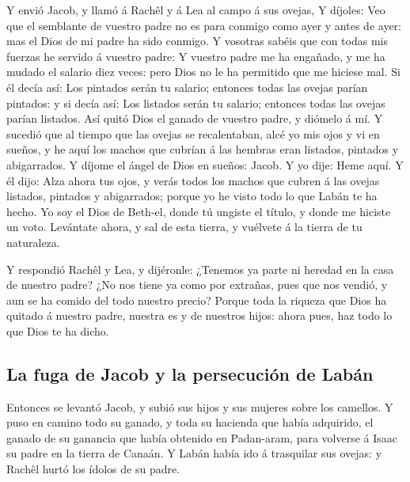 Y envió Jacob, y llamó á Rachêl y á Lea al campo á sus
ovejas,  Y díjoles: Veo que el semblante de vuestro padre no
es para conmigo como ayer y antes de ayer: mas el Dios de mi padre ha
sido conmigo.  Y vosotras sabéis que con todas mis fuerzas
he servido á vuestro padre:  Y vuestro padre me ha engañado,
y me ha mudado el salario diez veces: pero Dios no le ha permitido que
me hiciese mal.  Si él decía así: Los pintados serán tu
salario; entonces todas las ovejas parían pintados: y si decía así: Los
listados serán tu salario; entonces todas las ovejas parían listados.
 Así quitó Dios el ganado de vuestro padre, y diómelo á mí.
 Y sucedió que al tiempo que las ovejas se recalentaban,
alcé yo mis ojos y vi en sueños, y he aquí los machos que cubrían á las
hembras eran listados, pintados y abigarrados.  Y díjome el
ángel de Dios en sueños: Jacob. Y yo dije: Heme aquí.  Y él
dijo: Alza ahora tus ojos, y verás todos los machos que cubren á las
ovejas listados, pintados y abigarrados; porque yo he visto todo lo que
Labán te ha hecho.  Yo soy el Dios de Beth-el, donde tú
ungiste el título, y donde me hiciste un voto. Levántate ahora, y sal de
esta tierra, y vuélvete á la tierra de tu naturaleza.

 Y respondió Rachêl y Lea, y dijéronle: ¿Tenemos ya parte
ni heredad en la casa de nuestro padre?  ¿No nos tiene ya
como por extrañas, pues que nos vendió, y aun se ha comido del todo
nuestro precio?  Porque toda la riqueza que Dios ha quitado
á nuestro padre, nuestra es y de nuestros hijos: ahora pues, haz todo lo
que Dios te ha dicho.

\hypertarget{la-fuga-de-jacob-y-la-persecuciuxf3n-de-labuxe1n}{%
\subsection{La fuga de Jacob y la persecución de
Labán}\label{la-fuga-de-jacob-y-la-persecuciuxf3n-de-labuxe1n}}

 Entonces se levantó Jacob, y subió sus hijos y sus mujeres
sobre los camellos.  Y puso en camino todo su ganado, y
toda su hacienda que había adquirido, el ganado de su ganancia que había
obtenido en Padan-aram, para volverse á Isaac su padre en la tierra de
Canaán.  Y Labán había ido á trasquilar sus ovejas: y
Rachêl hurtó los ídolos de su padre.

